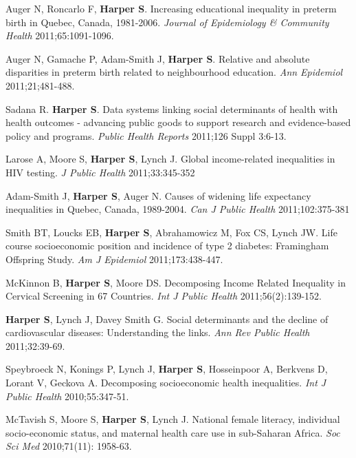 \documentclass[
  letterpaper,
  DIV=11,
  numbers=noendperiod]{scrartcl}
\begin{document}
\begin{etaremune}
\item Auger N, Roncarlo F, \textbf{Harper S}. Increasing educational inequality in preterm birth in Quebec, Canada, 1981-2006. \emph{Journal of Epidemiology \& Community Health} 2011;65:1091-1096. 
 
\item Auger N, Gamache P, Adam-Smith J, \textbf{Harper S}. Relative and absolute disparities in preterm birth related to neighbourhood education. \emph{Ann Epidemiol} 2011;21;481-488.
 
\item Sadana R. \textbf{Harper S}. Data systems linking social determinants of health with health outcomes - advancing public goods to support research and evidence-based policy and programs. \emph{Public Health Reports} 2011;126 Suppl 3:6-13.
 
\item Larose A, Moore S, \textbf{Harper S}, Lynch J. Global income-related inequalities in HIV testing. \emph{J Public Health} 2011;33:345-352
 
\item *Adam-Smith J, \textbf{Harper S}, Auger N. Causes of widening life expectancy inequalities in Quebec, Canada, 1989-2004. \emph{Can J Public Health} 2011;102:375-381
 
\item Smith BT, Loucks EB, \textbf{Harper S}, Abrahamowicz M, Fox CS, Lynch JW. Life course socioeconomic position and incidence of type 2 diabetes: Framingham Offspring Study. \emph{Am J Epidemiol} 2011;173:438-447.
 
\item *McKinnon B, \textbf{Harper S}, Moore DS. Decomposing Income Related Inequality in Cervical Screening in 67 Countries. \emph{Int J Public Health} 2011;56(2):139-152.
 
\item \textbf{Harper S}, Lynch J, Davey Smith G. Social determinants and the decline of cardiovascular diseases: Understanding the links. \emph{Ann Rev Public Health} 2011;32:39-69.

\item Speybroeck N, Konings P, Lynch J, \textbf{Harper S}, Hosseinpoor A, Berkvens D, Lorant V, Geckova A.  Decomposing socioeconomic health inequalities.  \emph{Int J Public Health} 2010;55:347-51.
 
\item McTavish S, Moore S, \textbf{Harper S}, Lynch J. National female literacy, individual socio-economic status, and maternal health care use in sub-Saharan Africa. \emph{Soc Sci Med} 2010;71(11): 1958-63.
 

\end{etaremune}
\end{document}
